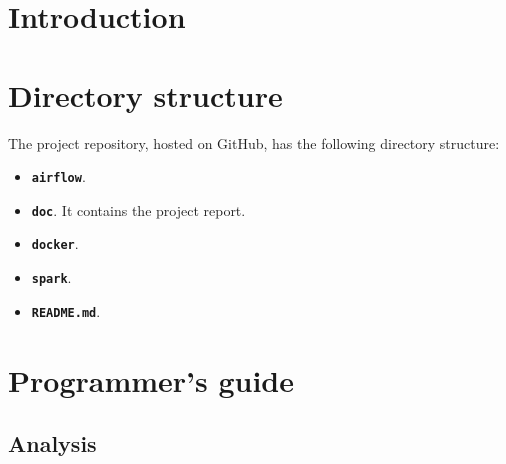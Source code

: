 
\section{Introduction}

\section{Directory structure}
\nonzeroparskip The project repository, hosted on GitHub, has the following directory structure:
\begin{itemize}
	\item \textbf{\texttt{airflow}}.
	\item \textbf{\texttt{doc}}. It contains the project report.
	\item \textbf{\texttt{docker}}. 
	\item \textbf{\texttt{spark}}. 
	\item \textbf{\texttt{README.md}}. 
\end{itemize}

\section{Programmer's guide}

\subsection{Analysis}

